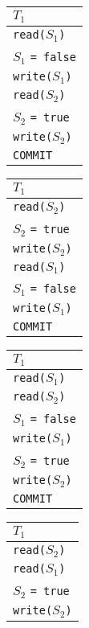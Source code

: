 \documentclass{report}
\newenvironment{example}{\begin{tcolorbox}[title={Example},colback=green!5!white,colframe=black!75!green]}{\end{tcolorbox}}
\renewcommand{\tt}[1]{\texttt{{#1}}}
\begin{document}
\begin{example}
    {
        \small
        \centering
        \begin{tabular}{l}
            $T_1$ \\
            \hline
            \tt{read($S_1$)} \\
            $S_1$ \tt{= false} \\
            \tt{write($S_1$)} \\
            \tt{read($S_2$)} \\
            $S_2$ \tt{= true} \\
            \tt{write($S_2$)} \\
            \tt{COMMIT}
        \end{tabular}
        \hspace{1em}
        \begin{tabular}{l}
            $T_1$ \\
            \hline
            \tt{read($S_2$)} \\
            $S_2$ \tt{= true} \\
            \tt{write($S_2$)} \\
            \tt{read($S_1$)} \\
            $S_1$ \tt{= false} \\
            \tt{write($S_1$)} \\
            \tt{COMMIT}
        \end{tabular}
        \hspace{1em}
        \begin{tabular}{l}
            $T_1$ \\
            \hline
            \tt{read($S_1$)} \\
            \tt{read($S_2$)} \\
            $S_1$ \tt{= false} \\
            \tt{write($S_1$)} \\
            $S_2$ \tt{= true} \\
            \tt{write($S_2$)} \\
            \tt{COMMIT}
        \end{tabular}
        \hspace{1em}
        \begin{tabular}{l}
            $T_1$ \\
            \hline
            \tt{read($S_2$)} \\
            \tt{read($S_1$)} \\
            $S_2$ \tt{= true} \\
            \tt{write($S_2$)} \\

\end{tabular}}
\end{example}
\end{document}
